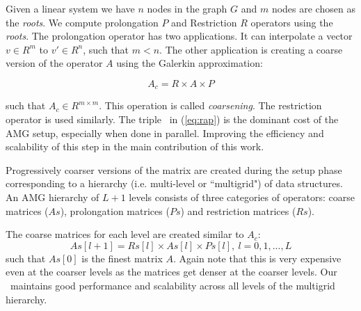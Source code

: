 Given a linear system we have $n$ 
nodes in the graph $G$ and $m$ nodes are chosen as the \textit{roots}.
We compute prolongation $P$ and Restriction $R$ operators using the \textit{roots}. 
The prolongation operator has two applications. It can interpolate a vector $v \in R^m$ to $v' \in R^n$, such that $m < n$.
The other application is creating a coarse version of the operator $A$ using the Galerkin approximation:

\begin{equation}
  \label{eq:rap}
 A_c = R \times A \times P
\end{equation}

\noindent such that $A_c \in R^{m \times m}$. This operation is called \textit{coarsening}.
The restriction operator is used similarly. The triple \mm\ in (\ref{eq:rap}) is the dominant cost of the AMG setup, especially when done in parallel. Improving the efficiency and scalability of this step in the main contribution of this work. 

Progressively coarser versions of the matrix are created during the setup phase corresponding to
a hierarchy (i.e. multi-level or ``multigrid") of data structures.
An AMG hierarchy of $L+1$ levels consists of three categories of operators:
coarse matrices ($As$), prolongation matrices ($Ps$) and restriction matrices ($Rs$).


The coarse matrices for each level are created similar to $A_c$:
\begin{equation*}
 As[l+1] = Rs[l] \times As[l] \times Ps[l],\ l = 0, 1, ..., L
\end{equation*}
such that $As[0]$ is the finest matrix $A$. Again note that this is very expensive even at the coarser levels as the matrices get denser at the coarser levels. Our \mm\ maintains good performance and scalability across all levels of the multigrid hierarchy. 

